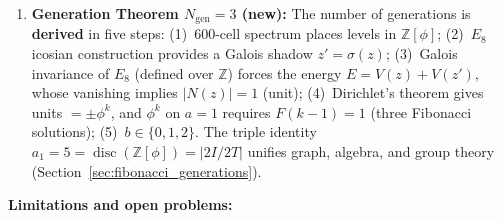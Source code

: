 \documentclass[12pt,a4paper]{article}
\begin{document}
\begin{enumerate}
    \item \textbf{Generation Theorem $N_{\text{gen}} = 3$ (new):} The number of generations is \textbf{derived} in five steps: (1)~600-cell spectrum places levels in $\mathbb{Z}[\phi]$; (2)~$E_8$ icosian construction provides a Galois shadow $z' = \sigma(z)$; (3)~Galois invariance of $E_8$ (defined over $\mathbb{Z}$) forces the energy $E = V(z) + V(z')$, whose vanishing implies $|N(z)| = 1$ (unit); (4)~Dirichlet's theorem gives units $= \pm\phi^k$, and $\phi^k$ on $a=1$ requires $F(k\!-\!1) = 1$ (three Fibonacci solutions); (5)~$b \in \{0,1,2\}$. The triple identity $a_1 = 5 = \operatorname{disc}(\mathbb{Z}[\phi]) = |2I/2T|$ unifies graph, algebra, and group theory (Section~\ref{sec:fibonacci_generations}).
\end{enumerate}

\textbf{Limitations and open problems:}
\end{document}
